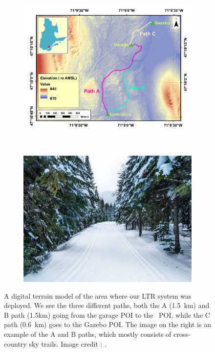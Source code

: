 \begin{figure}[htpb]
	\begin{center}
		\begin{subfigure}[b]{0.45\textwidth}
			\includegraphics[width=\linewidth]{figs/map-dem.pdf}
			\label{fig:view_above}
		\end{subfigure}%
		~~
		\begin{subfigure}[b]{0.45\textwidth}
			\includegraphics[width=\linewidth]{figs/foret-montmorency-path.pdf}
			\label{fig:view_path}
		\end{subfigure}%
		\caption{A digital terrain model of the area where our \ac{LTR} system was deployed.
		We see the three different paths, both the A (\SI{1.5}{km}) and B path ({1.5}{km}) going from the garage \ac{POI} to the \laverdiere~\ac{POI}, while the C path (\SI{0.6}{km}) goes to the Gazebo \ac{POI}.
		The image on the right is an example of the A and B paths, which mostly consists of cross-country sky trails.
		Image credit : \foretmo.} 
		\label{fig:forest}
	\end{center}
\end{figure}

